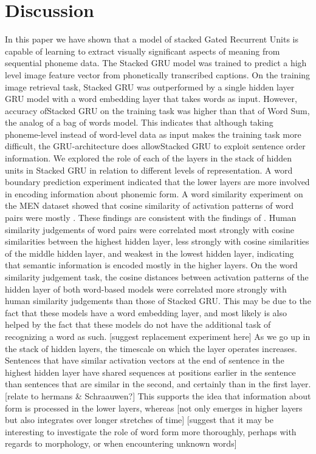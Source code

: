 \section{Discussion}
\label{sec:discussion}
In this paper we have shown that a model of stacked Gated Recurrent Units is capable of learning to extract visually significant aspects of meaning from sequential phoneme data. The {\sc Stacked GRU} model was trained to predict a high level image feature vector from phonetically transcribed captions. On the training image retrieval task, {\sc Stacked GRU} was outperformed by a single hidden layer GRU model with a word embedding layer that takes words as input. However, accuracy of{\sc Stacked GRU} on the training task was higher than that of {\sc Word Sum}, the analog of a bag of words model. This indicates that although taking phoneme-level instead of word-level data as input makes the training task more difficult, the GRU-architecture does allow{\sc Stacked GRU} to exploit sentence order information.
We explored the role of each of the layers in the stack of hidden units in {\sc Stacked GRU} in relation to different levels of representation. A word boundary prediction experiment indicated that the lower layers are more involved in encoding information about phonemic form. A word similarity experiment on the MEN dataset showed that cosine similarity of activation patterns of word pairs were mostly . These findings are consistent with the findings of . 
Human similarity judgements of word pairs were correlated most strongly with cosine similarities between the highest hidden layer, less strongly with cosine similarities of the middle hidden layer, and weakest in the lowest hidden layer, indicating that semantic information is encoded mostly in the higher layers. On the word similarity judgement task, the cosine distances between activation patterns of the hidden layer of both word-based models were correlated more strongly with human similarity judgements than those of {\sc Stacked GRU}. This may be due to the fact that these models have a word embedding layer, and most likely is also helped by the fact that these models do not have the additional task of recognizing a word as such. [suggest replacement experiment here]
As we go up in the stack of hidden layers, the timescale on which the layer operates increases. Sentences that have similar activation vectors at the end of sentence in the highest hidden layer have shared sequences at positions earlier in the sentence than sentences that are similar in the second, and certainly than in the first layer. [relate to hermans & Schraauwen?] This supports the idea that information about form is processed in the lower layers, whereas [not only emerges in higher layers but also integrates over longer stretches of time]
[suggest that it may be interesting to investigate the role of word form more thoroughly, perhaps with regards to morphology, or when encountering unknown words]